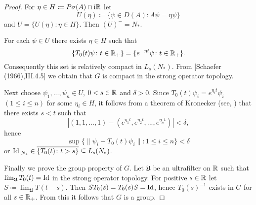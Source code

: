 \begin{proof}
For $\eta \in H \coloneqq P\sigma(A) \cap \mathrm{i}\mathbb{R}$ let
\[
U(\eta) \coloneqq \{\psi \in D(A): A\psi = \eta\psi\}
\]
and $U = \{U(\eta) \colon \eta \in H\}$.
Then $(U)^{-} = N_{*}$.

For each $\psi \in U$ there exists $\eta \in H$ such that
\[
\{T_{0}(t)\psi \colon t \in \mathbb{R}_{+}\} = \{e^{-\eta t}\psi \colon t \in \mathbb{R}_{+}\} .
\]
Consequently this set is relatively compact in $L_{s}(N_{*})$.
From [Schaefer (1966),III.4.5] we obtain that $G$ is compact in the strong operator topology.

Next choose $\psi_{1}, ..., \psi_{n} \in U$, $0 < s \in \mathbb{R}$ and $\delta > 0$.
Since $T_{0}(t)\psi_{i} = e^{\eta_{i}t}\psi_{i}$ $(1 \leq i \leq n)$ for some $\eta_{i} \in H$, it follows from a theorem of Kronecker (see, \citet[Satz 6.1., p.77]{jacobs:1972}) that there exists $s < t$ such that
\[
|(1,1, ..., 1) - (e^{\eta_{1}t}, e^{\eta_{2}t}, ..., e^{\eta_{n}t})| < \delta ,
\]
hence
\[
\sup\{\|\psi_{i} - T_{0}(t)\psi_{i}\| \colon 1 \leq i \leq n\} < \delta
\]
or $\operatorname{Id}_{|N_{*}} \in \overline{\{T_{0}(t) \colon t>s\}} \subseteq L_{s}(N_{*})$.

Finally we prove the group property of $G$.
Let $\mathfrak{U}$ be an ultrafilter on $\mathbb{R}$ such that $\lim_{\mathfrak{U}}T_{0}(t) = \operatorname{Id}$ in the strong operator topology.
For positive $s \in \mathbb{R}$ let $S \coloneqq \lim_{\mathfrak{U}}T(t-s)$.
Then $ST_{0}(s) = T_{0}(s)S = \operatorname{Id}$, hence $T_{0}(s)^{-1}$ exists in $G$ for all $s \in \mathbb{R}_{+}$.
From this it follows that $G$ is a group.
\end{proof}

